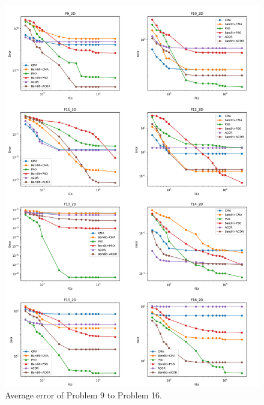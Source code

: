\begin{figure}
\centering
\includegraphics[width=\textwidth]{Average_F9_F16}
\caption{Average error of Problem 9 to Problem 16.}\label{fig:Average_F9_F16}
\end{figure}


